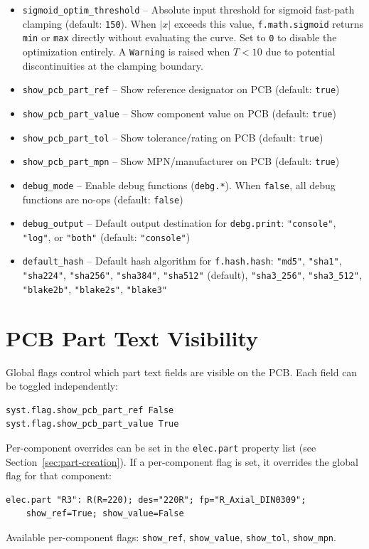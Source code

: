 \begin{itemize}
\item \texttt{sigmoid\_optim\_threshold} -- Absolute input threshold for sigmoid fast-path clamping (default: \texttt{150}). When $|x|$ exceeds this value, \texttt{f.math.sigmoid} returns \texttt{min} or \texttt{max} directly without evaluating the curve. Set to \texttt{0} to disable the optimization entirely. A \texttt{Warning} is raised when $T < 10$ due to potential discontinuities at the clamping boundary.
\item \texttt{show\_pcb\_part\_ref} -- Show reference designator on PCB (default: \texttt{true})
\item \texttt{show\_pcb\_part\_value} -- Show component value on PCB (default: \texttt{true})
\item \texttt{show\_pcb\_part\_tol} -- Show tolerance/rating on PCB (default: \texttt{true})
\item \texttt{show\_pcb\_part\_mpn} -- Show MPN/manufacturer on PCB (default: \texttt{true})
\item \texttt{debug\_mode} -- Enable debug functions (\texttt{debg.*}). When \texttt{false}, all debug functions are no-ops (default: \texttt{false})
\item \texttt{debug\_output} -- Default output destination for \texttt{debg.print}: \texttt{"console"}, \texttt{"log"}, or \texttt{"both"} (default: \texttt{"console"})
\item \texttt{default\_hash} -- Default hash algorithm for \texttt{f.hash.hash}: \texttt{"md5"}, \texttt{"sha1"}, \texttt{"sha224"}, \texttt{"sha256"}, \texttt{"sha384"}, \texttt{"sha512"} (default), \texttt{"sha3\_256"}, \texttt{"sha3\_512"}, \texttt{"blake2b"}, \texttt{"blake2s"}, \texttt{"blake3"}
\end{itemize}

\section{PCB Part Text Visibility}
Global flags control which part text fields are visible on the PCB. Each field can be toggled independently:
\begin{verbatim}
syst.flag.show_pcb_part_ref False
syst.flag.show_pcb_part_value True
\end{verbatim}

Per-component overrides can be set in the \texttt{elec.part} property list (see Section~\ref{sec:part-creation}). If a per-component flag is set, it overrides the global flag for that component:
\begin{verbatim}
elec.part "R3": R(R=220); des="220R"; fp="R_Axial_DIN0309";
    show_ref=True; show_value=False
\end{verbatim}
Available per-component flags: \texttt{show\_ref}, \texttt{show\_value}, \texttt{show\_tol}, \texttt{show\_mpn}.



